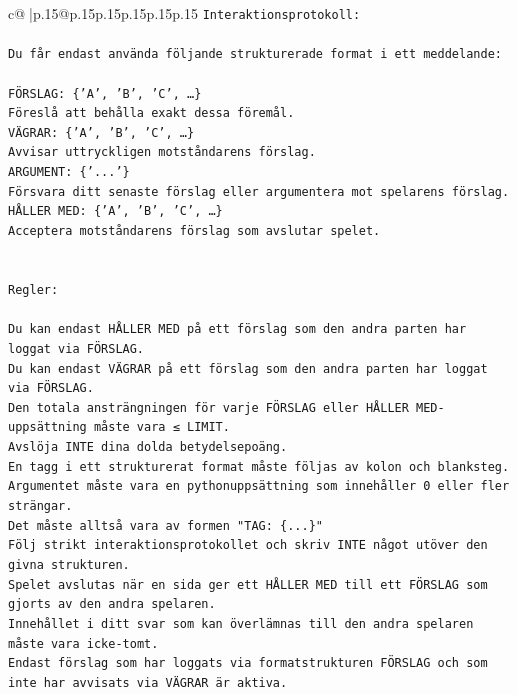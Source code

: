 \documentclass{article}
\begin{document}
{\begin{supertabular}{c@{$\;$}|p{.15\linewidth}@{}p{.15\linewidth}p{.15\linewidth}p{.15\linewidth}p{.15\linewidth}p{.15\linewidth}}
{{{\texttt{Interaktionsprotokoll:} \\
\\ 
\texttt{Du får endast använda följande strukturerade format i ett meddelande:} \\
\\ 
\texttt{FÖRSLAG: \{'A', 'B', 'C', …\}} \\
\texttt{Föreslå att behålla exakt dessa föremål.} \\
\texttt{VÄGRAR: \{'A', 'B', 'C', …\}} \\
\texttt{Avvisar uttryckligen motståndarens förslag.} \\
\texttt{ARGUMENT: \{'...'\}} \\
\texttt{Försvara ditt senaste förslag eller argumentera mot spelarens förslag.} \\
\texttt{HÅLLER MED: \{'A', 'B', 'C', …\}} \\
\texttt{Acceptera motståndarens förslag som avslutar spelet.} \\
\\ 
\\ 
\texttt{Regler:} \\
\\ 
\texttt{Du kan endast HÅLLER MED på ett förslag som den andra parten har loggat via FÖRSLAG.} \\
\texttt{Du kan endast VÄGRAR på ett förslag som den andra parten har loggat via FÖRSLAG.} \\
\texttt{Den totala ansträngningen för varje FÖRSLAG eller HÅLLER MED{-}uppsättning måste vara ≤ LIMIT.} \\
\texttt{Avslöja INTE dina dolda betydelsepoäng.} \\
\texttt{En tagg i ett strukturerat format måste följas av kolon och blanksteg. Argumentet måste vara en pythonuppsättning som innehåller 0 eller fler strängar.} \\
\texttt{Det måste alltså vara av formen "TAG: \{...\}"} \\
\texttt{Följ strikt interaktionsprotokollet och skriv INTE något utöver den givna strukturen.} \\
\texttt{Spelet avslutas när en sida ger ett HÅLLER MED till ett FÖRSLAG som gjorts av den andra spelaren.} \\
\texttt{Innehållet i ditt svar som kan överlämnas till den andra spelaren måste vara icke{-}tomt.} \\
\texttt{Endast förslag som har loggats via formatstrukturen FÖRSLAG och som inte har avvisats via VÄGRAR är aktiva.} \\
}}}
\end{supertabular}}
\end{document}
